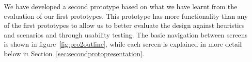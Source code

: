 We have developed a second prototype based on what we have learnt from the
evaluation of our first prototypes. This prototype has more functionality than
any of the first prototypes to allow us to better evaluate the design against
heuristics and scenarios and through usability testing. The basic navigation
between screens is shown in figure~\ref{fig:pro2outline}, while each screen is
explained in more detail below in Section~\ref{sec:secondprotopresentation}.
